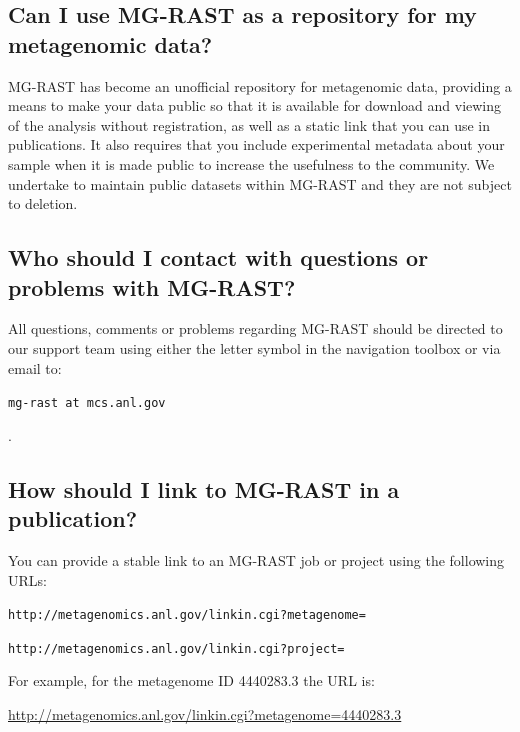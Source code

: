 \documentclass[12pt,fullpage]{report}
\begin{document}
\subsection{Can I use MG-RAST as a repository for my metagenomic data?}
MG-RAST has become an unofficial repository for metagenomic data, providing a means to make your data public so that it is available for download and viewing of the analysis without registration, as well as a static link that you can use in publications. It also requires that you include experimental metadata about your sample when it is made public to increase the usefulness to the community. We undertake to maintain public datasets within MG-RAST and they are not subject to deletion.
\subsection{Who should I contact with questions or problems with MG-RAST?}
All questions, comments or problems regarding MG-RAST should be directed to our support team using either the letter symbol in the navigation toolbox or via email to: \begin{small}\texttt{mg-rast at mcs.anl.gov}\end{small}.
\subsection{How should I link to MG-RAST in a publication?}
You can provide a stable link to an MG-RAST job or project using the following URLs:

\begin{small}\texttt{http://metagenomics.anl.gov/linkin.cgi?metagenome=}\end{small}

\begin{small}\texttt{http://metagenomics.anl.gov/linkin.cgi?project=}\end{small}

\noindent
For example, for the metagenome ID 4440283.3 the URL is:

\begin{small}\url{http://metagenomics.anl.gov/linkin.cgi?metagenome=4440283.3}\end{small}
\end{document}
